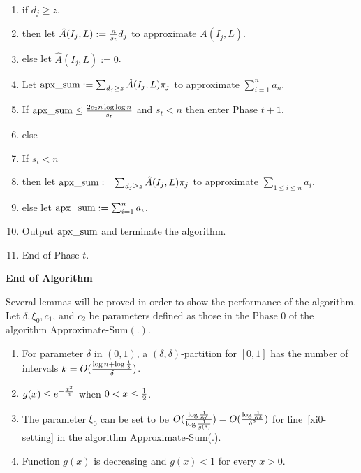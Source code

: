 \documentclass[runningheads]{llncs}
\newcommand{\scrod}{\quad\nopagebreak}
\newcommand{\appsum}{{\rm apx\_sum}}
\begin{document}
\begin{enumerate}[1.]
\item
\qquad\qquad if $d_j\ge z$,

\item\label{assign-hat-C}
\qquad\qquad then let $\hat{A}(I_j,L):={n\over s_t}d_j$ to
approximate $A(I_j,L)$.

\item\label{I-j-loop-end}
\qquad\qquad else let $\hat{A}(I_j,L):=0$.



\item\label{loop-m-end}
\qquad Let $\appsum:=\sum_{d_j\ge z}\hat{A}(I_j,L)\pi_j$ to
approximate $\sum_{i=1}^n a_n$.

\item\label{until-condition}
\qquad If $\appsum\le {2c_2n\log\log n\over s_t}$ and $s_t< n$ then
enter Phase $t+1$.

\item
\qquad else

\item
\qquad\qquad If $s_t<n$

\item
\qquad\qquad then let $\appsum:=\sum_{d_j\ge z}\hat{A}(I_j,L)\pi_j$
to approximate $\sum_{1\le i\le n}a_i$.

\item
\qquad\qquad else let $\appsum:=\sum_{i=1}^na_i$.


\item
\qquad\qquad Output $\appsum$ and terminate the algorithm.

\item
End of Phase $t$.
\end{enumerate}


{\bf End of Algorithm}

\vskip 10pt

Several lemmas will be proved in order to show the performance of
the algorithm.  Let $\delta,\xi_0, c_1$, and $c_2$ be parameters
defined as those in the Phase 0 of the algorithm
Approximate-Sum$(.)$.




\begin{lemma}\label{prelimary-lemma}\scrod
\begin{enumerate}
\item\label{k-bound}
For parameter $\delta$ in $(0,1)$, a $(\delta,\delta)$-partition for
$[0,1]$ has the number of intervals $k= O({\log n+\log {1\over
\delta}\over \delta})$.

\item\label{g(x)-bound}
$g(x)\le e^{-{x^2\over 4}}$ when $0<x\le {1\over 2}$.

\item\label{x0-bound} The parameter
$\xi_0$ can be set to be $O({\log {1\over \alpha\delta}\over \log
{1\over g(\delta)}})=O({\log {1\over \alpha\delta}\over \delta^2})$
for line~\ref{xi0-setting} in the algorithm Approximate-Sum(.).

\item\label{g(x)-decreasing}
Function $g(x)$ is decreasing and $g(x)<1$ for every $x>0$.
\end{enumerate}
\end{lemma}
\end{document}
